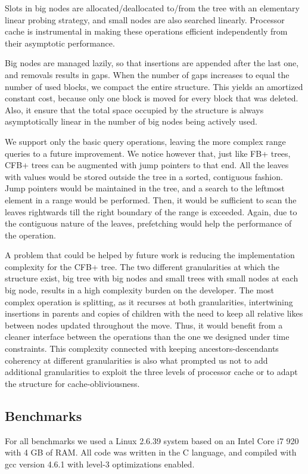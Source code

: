 \documentclass{article}
\begin{document}
Slots in big nodes are allocated/deallocated to/from the tree with an elementary linear probing strategy,
and small nodes are also searched linearly.
Processor cache is instrumental in making these operations efficient independently from their asymptotic performance.

Big nodes are managed lazily, so that insertions are appended after the last one, and removals results in gaps.
When the number of gaps increases to equal the number of used blocks, we compact the entire structure.
This yields an amortized constant cost, because only one block is moved for every block that was deleted.
Also, it ensure that the total space occupied by the structure is always asymptotically linear in the number
of big nodes being actively used.

We support only the basic query operations, leaving the more complex range queries to a future improvement.
We notice however that, just like FB+ trees, CFB+ trees can be augmented with jump pointers to that end.
All the leaves with values would be stored outside the tree in a sorted, contiguous fashion.
Jump pointers would be maintained in the tree, and a search to the leftmost element in a range would be performed.
Then, it would be sufficient to scan the leaves rightwards till the right boundary of the range is exceeded.
Again, due to the contiguous nature of the leaves, prefetching would help the performance of the operation.

A problem that could be helped by future work is reducing the implementation complexity for the CFB+ tree.
The two different granularities at which the structure exist, big tree with big nodes and small trees with small nodes
at each big node, results in a high complexity burden on the developer.
The most complex operation is splitting, as it recurses at both granularities, intertwining insertions in parents
and copies of children with the need to keep all relative likes between nodes updated throughout the move.
Thus, it would benefit from a cleaner interface between the operations than the one we designed under
time constraints. 
This complexity connected with keeping ancestors-descendants coherency at different granularities
is also what prompted us not to add additional granularities to exploit the three levels of processor cache
or to adapt the structure for cache-obliviousness.


\subsection{Benchmarks}
For all benchmarks we used a Linux 2.6.39 system based on an Intel Core i7 920 with 4 GB of RAM.
All code was written in the C language, and compiled with gcc version 4.6.1 with level-3 optimizations enabled.
\end{document}

